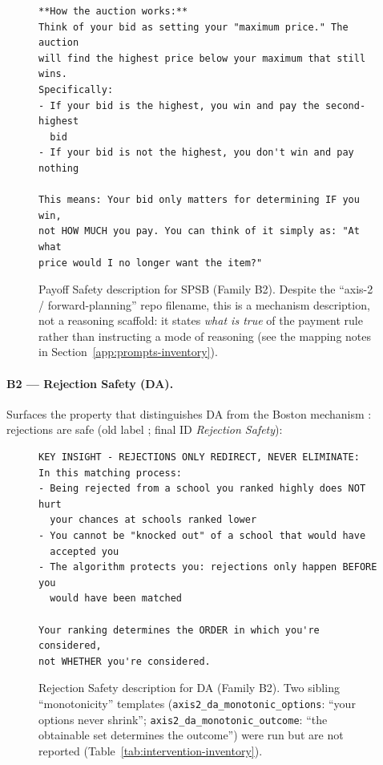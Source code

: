 \begin{figure}[H]
\begin{lstlisting}
**How the auction works:**
Think of your bid as setting your "maximum price." The auction
will find the highest price below your maximum that still wins.
Specifically:
- If your bid is the highest, you win and pay the second-highest
  bid
- If your bid is not the highest, you don't win and pay nothing

This means: Your bid only matters for determining IF you win,
not HOW MUCH you pay. You can think of it simply as: "At what
price would I no longer want the item?"
\end{lstlisting}
\caption{Payoff Safety description for SPSB (Family B2). Despite the ``axis-2 / forward-planning'' repo filename, this is a mechanism description, not a reasoning scaffold: it states \emph{what is true} of the payment rule rather than instructing a mode of reasoning (see the mapping notes in Section~\ref{app:prompts-inventory}).}
\label{fig:prompt-payoff-safety}
\end{figure}

\paragraph{B2 --- Rejection Safety (DA).} Surfaces the property that distinguishes DA from the Boston mechanism \citep{abdulkadirouglu2003school}: rejections are safe (old label ; final ID \emph{Rejection Safety}):

\begin{figure}[H]
\begin{lstlisting}
KEY INSIGHT - REJECTIONS ONLY REDIRECT, NEVER ELIMINATE:
In this matching process:
- Being rejected from a school you ranked highly does NOT hurt
  your chances at schools ranked lower
- You cannot be "knocked out" of a school that would have
  accepted you
- The algorithm protects you: rejections only happen BEFORE you
  would have been matched

Your ranking determines the ORDER in which you're considered,
not WHETHER you're considered.
\end{lstlisting}
\caption{Rejection Safety description for DA (Family B2). Two sibling ``monotonicity'' templates (\texttt{axis2\_da\_monotonic\_options}: ``your options never shrink''; \texttt{axis2\_da\_monotonic\_outcome}: ``the obtainable set determines the outcome'') were run but are not reported (Table~\ref{tab:intervention-inventory}).}
\label{fig:prompt-rejection-safety}
\end{figure}

